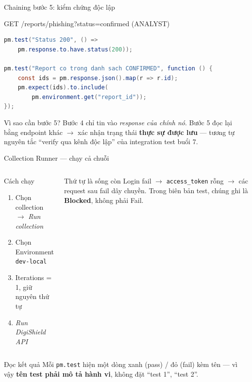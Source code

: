\documentclass[aspectratio=169,12pt]{beamer}
\begin{document}
\begin{frame}[fragile]{Chaining bước 5: kiểm chứng độc lập}
  \begin{block}{GET /reports/phishing?status=confirmed (ANALYST)}
\begin{lstlisting}[language=Java]
pm.test("Status 200", () =>
    pm.response.to.have.status(200));

pm.test("Report co trong danh sach CONFIRMED", function () {
    const ids = pm.response.json().map(r => r.id);
    pm.expect(ids).to.include(
        pm.environment.get("report_id"));
});
\end{lstlisting}
  \end{block}

  \begin{alertblock}{Vì sao cần bước 5?}
    Bước 4 chỉ tin vào \emph{response của chính nó}. Bước 5 đọc lại bằng
    endpoint khác $\to$ xác nhận trạng thái \textbf{thực sự được lưu} ---
    tương tự nguyên tắc ``verify qua kênh độc lập'' của integration test buổi 7.
  \end{alertblock}
\end{frame}

\begin{frame}{Collection Runner --- chạy cả chuỗi}
  \begin{columns}[T]
    \begin{block}{Cách chạy}
      \begin{enumerate}
        \item Chọn collection $\to$ \emph{Run collection}
        \item Chọn Environment \texttt{dev-local}
        \item Iterations = 1, giữ nguyên thứ tự
        \item \emph{Run DigiShield API}
      \end{enumerate}
    \end{block}

    \begin{alertblock}{Thứ tự là sống còn}
      Login fail $\to$ \texttt{access\_token} rỗng $\to$
      các request sau fail dây chuyền. Trong biên bản test,
      chúng ghi là \textbf{Blocked}, không phải Fail.
    \end{alertblock}
  \end{columns}

  \vspace{0.3em}
  \begin{block}{Đọc kết quả}
    Mỗi \texttt{pm.test} hiện một dòng xanh (pass) / đỏ (fail) kèm tên ---
    vì vậy \textbf{tên test phải mô tả hành vi}, không đặt ``test 1'', ``test 2''.
  \end{block}
\end{frame}
\end{document}
